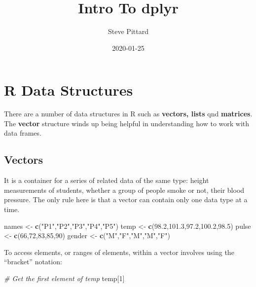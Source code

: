 \documentclass[]{book}
\title{Intro To dplyr}
\author{Steve Pittard}
\date{2020-01-25}
\newenvironment{Shaded}{\begin{snugshade}}{\end{snugshade}}
\newcommand{\CommentTok}[1]{\textcolor[rgb]{0.56,0.35,0.01}{\textit{#1}}}
\newcommand{\DecValTok}[1]{\textcolor[rgb]{0.00,0.00,0.81}{#1}}
\newcommand{\FloatTok}[1]{\textcolor[rgb]{0.00,0.00,0.81}{#1}}
\newcommand{\KeywordTok}[1]{\textcolor[rgb]{0.13,0.29,0.53}{\textbf{#1}}}
\newcommand{\NormalTok}[1]{#1}
\newcommand{\StringTok}[1]{\textcolor[rgb]{0.31,0.60,0.02}{#1}}
\begin{document}
\maketitle

{
\setcounter{tocdepth}{1}
\tableofcontents
}
\hypertarget{r-data-structures}{%
\chapter{R Data Structures}\label{r-data-structures}}

There are a number of data structures in R such as \textbf{vectors, lists} qnd \textbf{matrices}. The \textbf{vector} structure winds up being helpful in understanding how to work with data frames.

\hypertarget{vectors}{%
\section{Vectors}\label{vectors}}

It is a container for a series of related data of the same type: height measurements of students, whether a group of people smoke or not, their blood pressure. The only rule here is that a vector can contain only one data type at a time.

\begin{Shaded}
\begin{Highlighting}[]
\NormalTok{names  <-}\StringTok{ }\KeywordTok{c}\NormalTok{(}\StringTok{"P1"}\NormalTok{,}\StringTok{"P2"}\NormalTok{,}\StringTok{"P3"}\NormalTok{,}\StringTok{"P4"}\NormalTok{,}\StringTok{"P5"}\NormalTok{)}
\NormalTok{temp   <-}\StringTok{ }\KeywordTok{c}\NormalTok{(}\FloatTok{98.2}\NormalTok{,}\FloatTok{101.3}\NormalTok{,}\FloatTok{97.2}\NormalTok{,}\FloatTok{100.2}\NormalTok{,}\FloatTok{98.5}\NormalTok{)}
\NormalTok{pulse  <-}\StringTok{ }\KeywordTok{c}\NormalTok{(}\DecValTok{66}\NormalTok{,}\DecValTok{72}\NormalTok{,}\DecValTok{83}\NormalTok{,}\DecValTok{85}\NormalTok{,}\DecValTok{90}\NormalTok{)}
\NormalTok{gender <-}\StringTok{ }\KeywordTok{c}\NormalTok{(}\StringTok{"M"}\NormalTok{,}\StringTok{"F"}\NormalTok{,}\StringTok{"M"}\NormalTok{,}\StringTok{"M"}\NormalTok{,}\StringTok{"F"}\NormalTok{)}
\end{Highlighting}
\end{Shaded}

To access elements, or ranges of elements, within a vector involves using the ``bracket'' notation:

\begin{Shaded}
\begin{Highlighting}[]
\CommentTok{# Get the first element of temp}
\NormalTok{temp[}\DecValTok{1}\NormalTok{]}
\end{Highlighting}
\end{Shaded}
\end{document}
